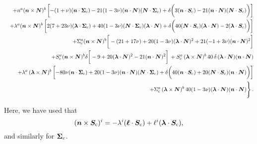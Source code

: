 \documentclass[aps, prd,
twocolumn,%
superscriptaddress,
showpacs, nofootinbib, eqsecnum, amsmath, amssymb, floatfix
]{revtex4}
\begin{document}
\begin{widetext}
\begin{eqnarray}
\nonumber\\
&&+ n^{a}(\bm{n}\times \bm{N})^{b}\left[
-(1+\nu) (\bm{n}\cdot \bm{\Sigma}_{\rm c})-
21(1-3\nu) (\bm{n}\cdot \bm{N}) (\bm{N}\cdot \bm{\Sigma}_{\rm c}) +
\delta \bigg(3(\bm{n} \cdot \bm{S}_{\rm c}) -
21 (\bm{n}\cdot \bm{N}) (\bm{N}\cdot \bm{S}_{\rm c}) \bigg)\right]\nonumber\\
&&+ \lambda^{a}(\bm{n}\times \bm{N})^{b}\left[
2(7+23\nu) (\bm{\lambda}\cdot \bm{\Sigma}_{\rm c})+
40 (1-3\nu)(\bm{N}\cdot \bm{\Sigma}_{\rm c}) (\bm{\lambda} \cdot \bm{N}) +
\delta \bigg(
40 (\bm{N}\cdot \bm{S}_{\rm c}) (\bm{\lambda} \cdot \bm{N})  -
2(\bm{\lambda}\cdot \bm{S}_{\rm c})\bigg)\right]\nonumber\\
&& + \Sigma_{\rm c}^{a} (\bm{n}\times \bm{N})^{b}\bigg[-(21+17\nu)+
20 (1-3\nu) (\bm{\lambda}\cdot \bm{N})^2+
21(-1+3\nu)(\bm{n}\cdot \bm{N})^2\bigg]\nonumber\\
&&+ S_{\rm c}^{a} (\bm{n}\times \bm{N})^{b} \delta \bigg[
-9+20 (\bm{\lambda}\cdot \bm{N})^2-21(\bm{n}\cdot \bm{N})^2\bigg]\, +
S_{\rm c}^{a} \, (\bm{\lambda}\times \bm{N})^{b} \, 40
\, \delta \, (\bm{\lambda}\cdot \bm{N}) (\bm{n} \cdot \bm{N})
\nonumber\\
&&+ \lambda^{a} \, (\bm{\lambda}\times \bm{N})^{b} \left[
-80 \nu (\bm{n}\cdot \bm{\Sigma}_{\rm c})+
20(1-3\nu) (\bm{n}\cdot \bm{N}) (\bm{N}\cdot \bm{\Sigma}_{\rm c})+
\delta \bigg(40 (\bm{n}\cdot \bm{S}_{\rm c})+
20 (\bm{N} \cdot \bm{S}_{\rm c}) (\bm{n}\cdot \bm{N})\bigg)\right]\nonumber\\
&&+\Sigma_{\rm c}^{a} \, (\bm{\lambda}\times \bm{N})^{b}
\, 40(1-3\nu) (\bm{\lambda}\cdot \bm{N}) (\bm{n} \cdot \bm{N}) \Bigg\} \,.
\end{eqnarray}
\end{widetext}
Here, we have used that
%
\begin{equation}
 (\bm{n}\times\bm{S}_{\rm c})^i=-\lambda^i(\bm{\ell}\cdot \bm{S}_{\rm c})+
\ell^i(\bm{\lambda}\cdot \bm{S}_{\rm c}),
\end{equation}
%
and similarly for $\bm{\Sigma}_{\rm c}$.
\end{document}

